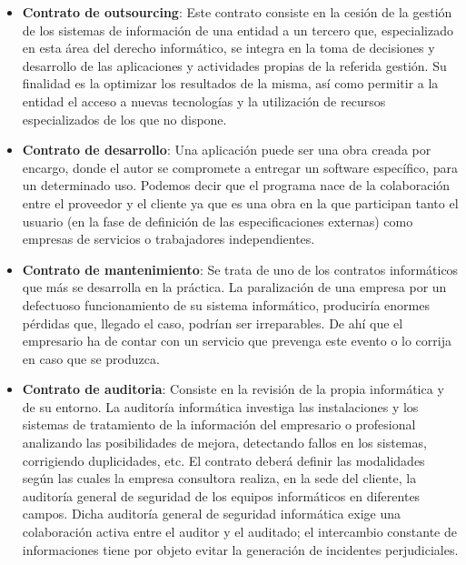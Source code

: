 \documentclass[12pt, a4paper]{report}
\begin{document}
            \begin{itemize}
            	\item \textbf{Contrato de outsourcing}: Este contrato consiste en la cesión de la gestión de los sistemas de información de una entidad a un tercero que, especializado en esta área del derecho informático, se integra en la toma de decisiones y desarrollo de las aplicaciones y actividades propias de la referida gestión. Su finalidad es la optimizar los resultados de la misma, así como permitir a la entidad el acceso a nuevas tecnologías y la utilización de recursos especializados de los que no dispone. \cite{tuabogadodefensor:contratos}

            	\item \textbf{Contrato de desarrollo}: Una aplicación puede ser una obra creada por encargo, donde el autor se compromete a entregar un software específico, para un determinado uso. Podemos decir que el programa nace de la colaboración entre el proveedor y el cliente ya que es una obra en la que participan tanto el usuario (en la fase de definición de las especificaciones externas) como empresas de servicios o trabajadores independientes. \cite{tuabogadodefensor:contratos}

            	\item \textbf{Contrato de mantenimiento}: Se trata de uno de los contratos informáticos que más se desarrolla en la práctica. La paralización de una empresa por un defectuoso funcionamiento de su sistema informático, produciría enormes pérdidas que, llegado el caso, podrían ser irreparables. De ahí que el empresario ha de contar con un servicio que prevenga este evento o lo corrija en caso que se produzca. \cite{tuabogadodefensor:contratos}

            	\item \textbf{Contrato de auditoria}: Consiste en la revisión de la propia informática y de su entorno. La auditoría informática investiga las instalaciones y los sistemas de tratamiento de la información del empresario o profesional analizando las posibilidades de mejora, detectando fallos en los sistemas, corrigiendo duplicidades, etc. El contrato deberá definir las modalidades según las cuales la empresa consultora realiza, en la sede del cliente, la auditoría general de seguridad de los equipos informáticos en diferentes campos. Dicha auditoría general de seguridad informática exige una colaboración activa entre el auditor y el auditado; el intercambio constante de informaciones tiene por objeto evitar la generación de incidentes perjudiciales. \cite{tuabogadodefensor:contratos}


\end{itemize}
\end{document}
